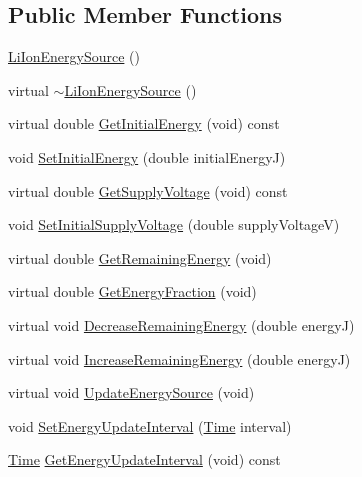 \subsection*{Public Member Functions}
\begin{DoxyCompactItemize}
\item 
\hyperlink{classns3_1_1LiIonEnergySource_a11429d9bb646cd2a080c08d56a14f524}{Li\+Ion\+Energy\+Source} ()
\item 
virtual \hyperlink{classns3_1_1LiIonEnergySource_a25466646d57885158cf6618d346a6604}{$\sim$\+Li\+Ion\+Energy\+Source} ()
\item 
virtual double \hyperlink{classns3_1_1LiIonEnergySource_a94b5b14c757a4679ea74fb402c954ff3}{Get\+Initial\+Energy} (void) const 
\item 
void \hyperlink{classns3_1_1LiIonEnergySource_a1c08ea6e5f1239db8873d9ae2343a665}{Set\+Initial\+Energy} (double initial\+EnergyJ)
\item 
virtual double \hyperlink{classns3_1_1LiIonEnergySource_a48b2c773b3a8aaf1e95bccfa851ededb}{Get\+Supply\+Voltage} (void) const 
\item 
void \hyperlink{classns3_1_1LiIonEnergySource_a91887078ebf74c1df1ff3fb93227068b}{Set\+Initial\+Supply\+Voltage} (double supply\+VoltageV)
\item 
virtual double \hyperlink{classns3_1_1LiIonEnergySource_a519935a69b4b4b3f347855cee794d4d8}{Get\+Remaining\+Energy} (void)
\item 
virtual double \hyperlink{classns3_1_1LiIonEnergySource_aa3844868e0940b3aa5a7817388de7dd0}{Get\+Energy\+Fraction} (void)
\item 
virtual void \hyperlink{classns3_1_1LiIonEnergySource_af408d4480446af4fa75dc22df19ecdec}{Decrease\+Remaining\+Energy} (double energyJ)
\item 
virtual void \hyperlink{classns3_1_1LiIonEnergySource_a415ff33b2d117c142e12c6a31ac8cb3b}{Increase\+Remaining\+Energy} (double energyJ)
\item 
virtual void \hyperlink{classns3_1_1LiIonEnergySource_a189ac70234f5af2d1b1457ea43bd1b9f}{Update\+Energy\+Source} (void)
\item 
void \hyperlink{classns3_1_1LiIonEnergySource_a70a624588e92d89944f1d9c910540b36}{Set\+Energy\+Update\+Interval} (\hyperlink{classns3_1_1Time}{Time} interval)
\item 
\hyperlink{classns3_1_1Time}{Time} \hyperlink{classns3_1_1LiIonEnergySource_a26eebd82923e091e8005c8d9f70b8a63}{Get\+Energy\+Update\+Interval} (void) const 
\end{DoxyCompactItemize}
